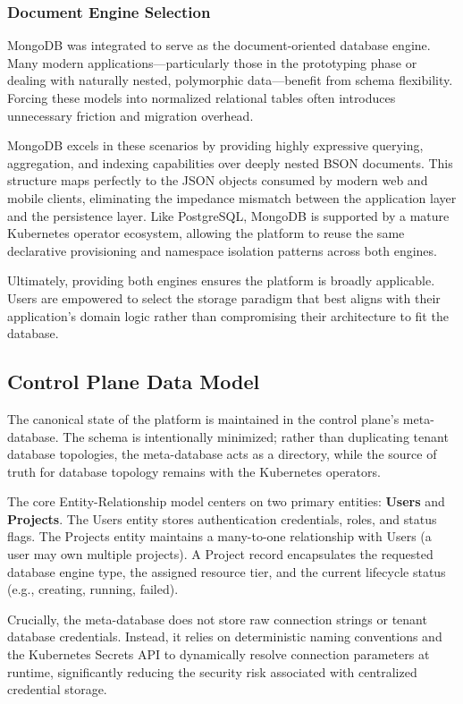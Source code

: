 \subsubsection*{Document Engine Selection}

MongoDB was integrated to serve as the document-oriented database engine. Many modern applications—particularly those in the prototyping phase or dealing with naturally nested, polymorphic data—benefit from schema flexibility. Forcing these models into normalized relational tables often introduces unnecessary friction and migration overhead.

MongoDB excels in these scenarios by providing highly expressive querying, aggregation, and indexing capabilities over deeply nested BSON documents. This structure maps perfectly to the JSON objects consumed by modern web and mobile clients, eliminating the impedance mismatch between the application layer and the persistence layer. Like PostgreSQL, MongoDB is supported by a mature Kubernetes operator ecosystem, allowing the platform to reuse the same declarative provisioning and namespace isolation patterns across both engines.

Ultimately, providing both engines ensures the platform is broadly applicable. Users are empowered to select the storage paradigm that best aligns with their application's domain logic rather than compromising their architecture to fit the database.

\subsection{Control Plane Data Model}

The canonical state of the platform is maintained in the control plane's meta-database. The schema is intentionally minimized; rather than duplicating tenant database topologies, the meta-database acts as a directory, while the source of truth for database topology remains with the Kubernetes operators.

The core Entity-Relationship model centers on two primary entities: \textbf{Users} and \textbf{Projects}. The Users entity stores authentication credentials, roles, and status flags. The Projects entity maintains a many-to-one relationship with Users (a user may own multiple projects). A Project record encapsulates the requested database engine type, the assigned resource tier, and the current lifecycle status (e.g., creating, running, failed). 

Crucially, the meta-database does not store raw connection strings or tenant database credentials. Instead, it relies on deterministic naming conventions and the Kubernetes Secrets API to dynamically resolve connection parameters at runtime, significantly reducing the security risk associated with centralized credential storage.

